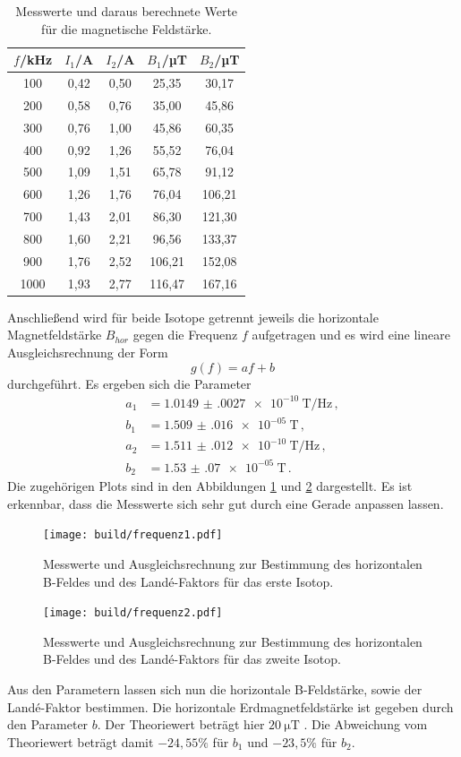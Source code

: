 \begin{table}[htp]
	\begin{center}
    \caption{Messwerte und daraus berechnete Werte für die magnetische Feldstärke.}
    \label{tab:werte}
		\begin{tabular}{ccccc}
		\toprule
			{$f$/kHz} & {$I_1$/A} & {$I_2$/A} & {$B_1$/µT} & {$B_2$/µT}\\
			\midrule
			100 & 0,42 & 0,50 & 25,35 & 30,17\\
			200 & 0,58 & 0,76 & 35,00 & 45,86\\
			300 & 0,76 & 1,00 & 45,86 & 60,35\\
			400 & 0,92 & 1,26 & 55,52 & 76,04\\
			500 & 1,09 & 1,51 & 65,78 & 91,12\\
			600 & 1,26 & 1,76 & 76,04 & 106,21\\
			700 & 1,43 & 2,01 & 86,30 & 121,30\\
			800 & 1,60 & 2,21 & 96,56 & 133,37\\
			900 & 1,76 & 2,52 & 106,21 & 152,08\\
			1000 & 1,93 & 2,77 & 116,47 & 167,16\\
		\bottomrule
		\end{tabular}
	\end{center}
\end{table}

Anschließend wird für beide Isotope getrennt jeweils die horizontale Magnetfeldstärke $B_{hor}$
gegen die Frequenz $f$ aufgetragen und es wird eine lineare Ausgleichsrechnung der Form
\begin{equation*}
  g(f)=af+b
\end{equation*}
durchgeführt. Es ergeben sich die Parameter
\begin{align*}
 a_1&= \SI{1.0149(0027)e-10}{\tesla\per\Hz}  \,,\\
 b_1&= \SI{1.509(016)e-05}{\tesla} \,,\\
 a_2&= \SI{1.511(012)e-10}{\tesla\per\Hz} \,,\\
 b_2&= \SI{1.53(07)e-05}{\tesla} \,.
\end{align*}
Die zugehörigen Plots sind in den Abbildungen \ref{fig:frequenz1} und \ref{fig:frequenz2} dargestellt.
Es ist erkennbar, dass die Messwerte sich sehr gut durch eine Gerade anpassen lassen.
\begin{figure}
  \centering
  \texttt{[image: build/frequenz1.pdf]}
  \caption{Messwerte und Ausgleichsrechnung zur Bestimmung des horizontalen B-Feldes und des Landé-Faktors für
  das erste Isotop.}
  \label{fig:frequenz1}
\end{figure}
\begin{figure}
  \centering
  \texttt{[image: build/frequenz2.pdf]}
  \caption{Messwerte und Ausgleichsrechnung zur Bestimmung des horizontalen B-Feldes und des Landé-Faktors für
  das zweite Isotop.}
  \label{fig:frequenz2}
\end{figure}
Aus den Parametern lassen sich nun die horizontale B-Feldstärke, sowie der Landé-Faktor bestimmen.
Die horizontale Erdmagnetfeldstärke ist gegeben durch den Parameter $b$. Der Theoriewert beträgt hier
$\SI{20}{\micro\tesla}$ \cite{erde}. Die Abweichung vom Theoriewert beträgt damit $-24{,}55\%$ für
$b_1$ und $-23{,}5\%$ für $b_2$.

